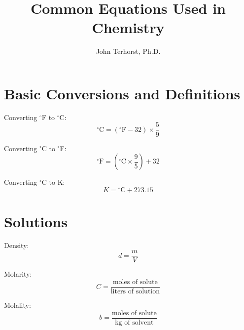\documentclass[10pt]{article}
\def\deg{$^{\circ}$}
\begin{document}
\title{Common Equations Used in Chemistry}
\author{John Terhorst, Ph.D.}

\maketitle
\tableofcontents


\newpage\section{Basic Conversions and Definitions}

Converting \deg F to \deg C:
\begin{equation*}
\textrm{\deg C} = (\textrm{\deg F}-32)\times \frac{5}{9}
\end{equation*}

Converting \deg C to \deg F:
\begin{equation*}
\textrm{\deg F} = \left(\textrm{\deg C}\times \frac{9}{5}\right) +32
\end{equation*}

Converting \deg C to K:
\begin{equation*}
K = \textrm{\deg C}+273.15
\end{equation*}


\section{Solutions}

Density:
\begin{equation*}
d = \frac{m}{V}
\end{equation*}

Molarity:
\begin{equation*}
C = \frac{\textrm{moles of solute}}{\textrm{liters of solution}}
\end{equation*}

Molality:
\begin{equation*}
b = \frac{\textrm{moles of solute}}{\textrm{kg of solvent}}
\end{equation*}
\end{document}
